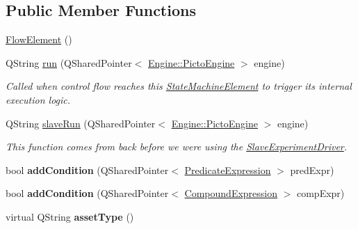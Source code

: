 \subsection*{Public Member Functions}
\begin{DoxyCompactItemize}
\item 
\hyperlink{class_picto_1_1_flow_element_ac77e2d038a07886eb94d8b8ebf82a18f}{Flow\-Element} ()
\item 
Q\-String \hyperlink{class_picto_1_1_flow_element_a4cc23957b12f5bd8b39fbd0de6d64cd1}{run} (Q\-Shared\-Pointer$<$ \hyperlink{class_picto_1_1_engine_1_1_picto_engine}{Engine\-::\-Picto\-Engine} $>$ engine)
\begin{DoxyCompactList}\small\item\em Called when control flow reaches this \hyperlink{class_picto_1_1_state_machine_element}{State\-Machine\-Element} to trigger its internal execution logic. \end{DoxyCompactList}\item 
Q\-String \hyperlink{class_picto_1_1_flow_element_a305d68e8cefb00cbb1f0d7f1c9026fc4}{slave\-Run} (Q\-Shared\-Pointer$<$ \hyperlink{class_picto_1_1_engine_1_1_picto_engine}{Engine\-::\-Picto\-Engine} $>$ engine)
\begin{DoxyCompactList}\small\item\em This function comes from back before we were using the \hyperlink{class_picto_1_1_slave_experiment_driver}{Slave\-Experiment\-Driver}. \end{DoxyCompactList}\item 
\hypertarget{class_picto_1_1_flow_element_a22d65b4776e329aa2b850380944b2d5e}{bool {\bfseries add\-Condition} (Q\-Shared\-Pointer$<$ \hyperlink{class_picto_1_1_predicate_expression}{Predicate\-Expression} $>$ pred\-Expr)}\label{class_picto_1_1_flow_element_a22d65b4776e329aa2b850380944b2d5e}

\item 
\hypertarget{class_picto_1_1_flow_element_a36c031f355d26a5af85a28cd08d72d54}{bool {\bfseries add\-Condition} (Q\-Shared\-Pointer$<$ \hyperlink{class_picto_1_1_compound_expression}{Compound\-Expression} $>$ comp\-Expr)}\label{class_picto_1_1_flow_element_a36c031f355d26a5af85a28cd08d72d54}

\item 
\hypertarget{class_picto_1_1_flow_element_a9664a54050db633481557a3af491b772}{virtual Q\-String {\bfseries asset\-Type} ()}\label{class_picto_1_1_flow_element_a9664a54050db633481557a3af491b772}

\end{DoxyCompactItemize}
